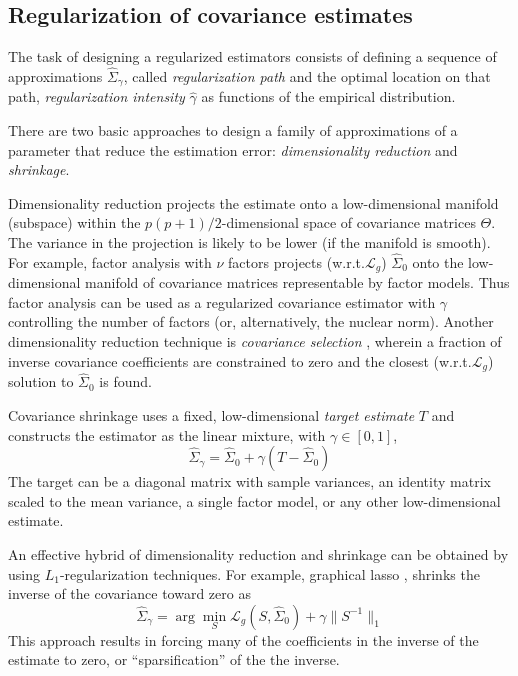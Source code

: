  
\subsection{Regularization of covariance estimates}
The task of designing a regularized estimators consists of defining a sequence of approximations $\hat\Sigma_\gamma$, called \emph{regularization path} and the optimal location on that path, \emph{regularization intensity} $\hat\gamma$ as  functions of the empirical distribution. 

There are two basic approaches to design a family of approximations of a parameter that reduce the estimation error: \emph{dimensionality reduction} and \emph{shrinkage}.  

Dimensionality reduction projects the estimate onto a low-dimensional manifold (subspace) within the $p(p+1)/2$-dimensional space of covariance matrices $\Theta$.  The variance in the projection is likely to be lower (if the manifold is smooth).  For example, factor analysis with $\nu$ factors projects (w.r.t.\;$\mathcal L_g$) $\hat\Sigma_0$ onto the low-dimensional manifold of covariance matrices representable by factor models. Thus factor analysis can be used as a regularized covariance estimator \citep{Fan:2008} with $\gamma$ controlling the number of factors (or, alternatively, the nuclear norm).  Another dimensionality reduction technique is \emph{covariance selection} \citep{Dempster:1972}, wherein a fraction of inverse covariance coefficients are constrained to zero and the closest (w.r.t.\;$\mathcal L_g$) solution to $\hat\Sigma_0$ is found. 

Covariance shrinkage \citep{Schafer:2005,Ledoit:2004} uses a fixed, low-dimensional \emph{target estimate} $T$ and constructs the estimator as the linear mixture, with $\gamma \in [0,1]$,
\begin{equation}
\hat\Sigma_\gamma = \hat\Sigma_0  + \gamma (T-\hat\Sigma_0) 
\end{equation}
 The target can be a diagonal matrix with sample variances, an identity matrix scaled to the mean variance, a single factor model, or any other low-dimensional estimate.

An effective hybrid of dimensionality reduction and shrinkage can be obtained by using $L_1$-regularization techniques.  For example, graphical lasso \citep{Meinshausen:2006,Friedman:2008}, shrinks the inverse of the covariance toward zero as 
\begin{equation}
\hat\Sigma_\gamma = \arg\min\limits_S \mathcal L_g(S,\hat \Sigma_0) + \gamma \| S^{-1} \|_1
\end{equation}
This approach results in forcing many of the coefficients in the inverse of the estimate to zero, or ``sparsification'' of the the inverse.

